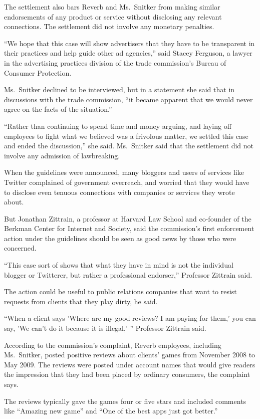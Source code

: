 ﻿\documentclass[12pt]{article}
\begin{document}
The settlement also bars Reverb and Ms.~Snitker from making similar endorsements of any product or
service without disclosing any relevant connections. The settlement did not involve any monetary
penalties.

``We hope that this case will show advertisers that they have to be transparent in their practices
and help guide other ad agencies,'' said Stacey Ferguson, a lawyer in the advertising practices
division of the trade commission's Bureau of Consumer Protection.

Ms.~Snitker declined to be interviewed, but in a statement she said that in discussions with the
trade commission, ``it became apparent that we would never agree on the facts of the situation.''

``Rather than continuing to spend time and money arguing, and laying off employees to fight what we
believed was a frivolous matter, we settled this case and ended the discussion,'' she said.
Ms.~Snitker said that the settlement did not involve any admission of lawbreaking.

When the guidelines were announced, many bloggers and users of services like Twitter complained of
government overreach, and worried that they would have to disclose even tenuous connections with
companies or services they wrote about.

But Jonathan Zittrain, a professor at Harvard Law School and co-founder of the Berkman Center for
Internet and Society, said the commission's first enforcement action under the guidelines should be
seen as good news by those who were concerned.

``This case sort of shows that what they have in mind is not the individual blogger or Twitterer,
but rather a professional endorser,'' Professor Zittrain said.

The action could be useful to public relations companies that want to resist requests from clients
that they play dirty, he said.

``When a client says 'Where are my good reviews? I am paying for them,' you can say, 'We can't do it
because it is illegal,' '' Professor Zittrain said.

According to the commission's complaint, Reverb employees, including Ms.~Snitker, posted positive
reviews about clients' games from November 2008 to May 2009. The reviews were posted under account
names that would give readers the impression that they had been placed by ordinary consumers, the
complaint says.

The reviews typically gave the games four or five stars and included comments like ``Amazing new
game'' and ``One of the best apps just got better.''
\end{document}
